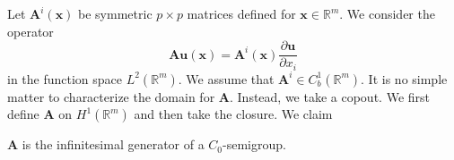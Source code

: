 Let $\bm{A}^i(\bm{x})$ be symmetric $p\times p$ matrices defined for $\bm{x}\in\mathbb{R}^m$. We consider the operator
\begin{equation}\label{eq:semigroup-symmetric-hyperbolic-spatial-operator}
\bm{A}\bm{u}(\bm{x})=\bm{A}^i(\bm{x})\dfrac{\partial\bm{u}}{\partial x_i}
\end{equation}
in the function space $L^2(\mathbb{R}^m)$. We assume that $\bm{A}^i\in C_b^1(\mathbb{R}^m)$. It is no simple matter to characterize the domain for $\bm{A}$. Instead, we take a copout. We first define $\bm{A}$ on $H^1(\mathbb{R}^m)$ and then take the closure. We claim

\begin{Theorem}
\label{thm:symmetric-hyperbolic-semigroup-generation}
$\bm{A}$ is the infinitesimal generator of a $C_0$-semigroup.
\end{Theorem}

\begingroup
\renewcommand{\endProof}{\par}
\endgroup

